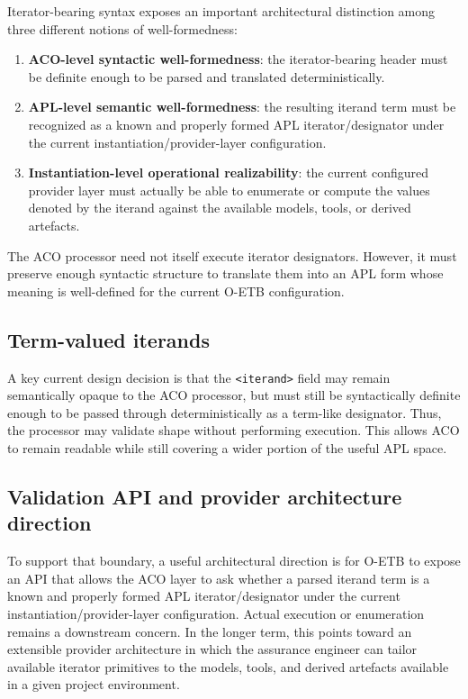 \documentclass[11pt,twoside,a4paper]{article}
\begin{document}
Iterator-bearing syntax exposes an important architectural distinction among three different notions of well-formedness:
\begin{enumerate}[leftmargin=2em]
  \item \textbf{ACO-level syntactic well-formedness}: the iterator-bearing header must be definite enough to be parsed and translated deterministically.
  \item \textbf{APL-level semantic well-formedness}: the resulting iterand term must be recognized as a known and properly formed APL iterator/designator under the current instantiation/provider-layer configuration.
  \item \textbf{Instantiation-level operational realizability}: the current configured provider layer must actually be able to enumerate or compute the values denoted by the iterand against the available models, tools, or derived artefacts.
\end{enumerate}

The ACO processor need not itself execute iterator designators.
However, it must preserve enough syntactic structure to translate them into an APL form whose meaning is well-defined for the current O-ETB configuration.

\subsection{Term-valued iterands}

A key current design decision is that the \texttt{<iterand>} field may remain semantically opaque to the ACO processor, but must still be syntactically definite enough to be passed through deterministically as a term-like designator.
Thus, the processor may validate shape without performing execution.
This allows ACO to remain readable while still covering a wider portion of the useful APL space.

\subsection{Validation API and provider architecture direction}

To support that boundary, a useful architectural direction is for O-ETB to expose an API that allows the ACO layer to ask whether a parsed iterand term is a known and properly formed APL iterator/designator under the current instantiation/provider-layer configuration.
Actual execution or enumeration remains a downstream concern.
In the longer term, this points toward an extensible provider architecture in which the assurance engineer can tailor available iterator primitives to the models, tools, and derived artefacts available in a given project environment.
\end{document}
